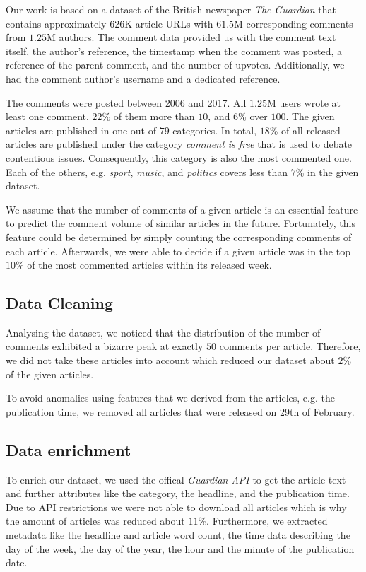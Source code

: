 Our work is based on a dataset of the British newspaper \textit{The Guardian} that contains approximately $626$K article URLs with $61.5$M corresponding comments from $1.25$M authors. 
The comment data provided us with the comment text itself, the author's reference, the timestamp when the comment was posted, a reference of the parent comment, and the number of upvotes. Additionally, we had the comment author's username and a dedicated reference. 

The comments were posted between 2006 and 2017. All $1.25$M users wrote at least one comment, $22$\% of them more than $10$, and $6$\% over $100$.
The given articles are published in one out of $79$ categories. In total, $18$\% of all released articles are published under the category \textit{comment is free} that is used to debate contentious issues. Consequently, this category is also the most commented one. 
Each of the others, e.g. \textit{sport}, \textit{music}, and \textit{politics} covers less than $7$\% in the given dataset.

We assume that the number of comments of a given article is an essential feature to predict the comment volume of similar articles in the future. Fortunately, this feature could be determined by simply counting the corresponding comments of each article. Afterwards, we were able to decide if a given article was in the top $10$\% of the most commented articles within its released week.

\subsection{Data Cleaning}
Analysing the dataset, we noticed that the distribution of the number of comments exhibited a bizarre peak at exactly $50$ comments per article. Therefore, we did not take these articles into account which reduced our dataset about $2$\% of the given articles.

To avoid anomalies using features that we derived from the articles, e.g. the publication time, we removed all articles that were released on 29th of February.

\subsection{Data enrichment}
To enrich our dataset, we used the offical \textit{Guardian API} to get the article text and further attributes like the category, the headline, and the publication time.
Due to API restrictions we were not able to download all articles which is why the amount of articles was reduced about $11$\%.
Furthermore, we extracted metadata like the headline and article word count, the time data describing the day of the week, the day of the year, the hour and the minute of the publication date.

